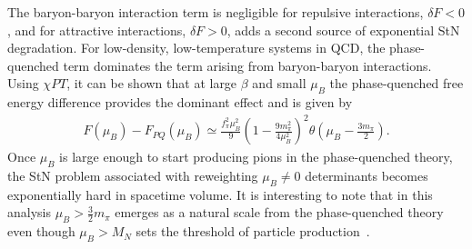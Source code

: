 The baryon-baryon interaction term is negligible for repulsive interactions, $\delta F <0$, and for attractive interactions, $\delta F > 0$, adds a second source of exponential StN degradation.
For low-density, low-temperature systems in QCD, the phase-quenched term dominates the term arising from baryon-baryon interactions. 
Using $\chi PT$, it can be shown that at large $\beta$ and small $\mu_B$ the phase-quenched free energy difference provides the dominant effect and is given by~\cite{Splittorff:2006fu}
\begin{equation}
  \begin{split}
    F(\mu_B) - F_{PQ}(\mu_B) \simeq  \frac{f_\pi^2 \mu_B^2}{9}\left( 1 - \frac{9m_\pi^2}{4\mu_B^2} \right)^2\theta\left(\mu_B - \frac{3 m_\pi}{2}\right).
  \end{split}\label{eq:ZStNChPT}
\end{equation}
Once $\mu_B$ is large enough to start producing pions in the phase-quenched theory, the StN problem associated with reweighting  $\mu_B \neq 0$ determinants becomes exponentially hard in spacetime volume.
It is interesting to note that in this analysis $\mu_B > \frac{3}{2} m_\pi$ emerges as a natural scale from the phase-quenched theory even though $\mu_B > M_N$ sets the threshold of particle production~\cite{Gibbs:1986ut,Gocksch:1987ha,Cohen:2003kd}.

